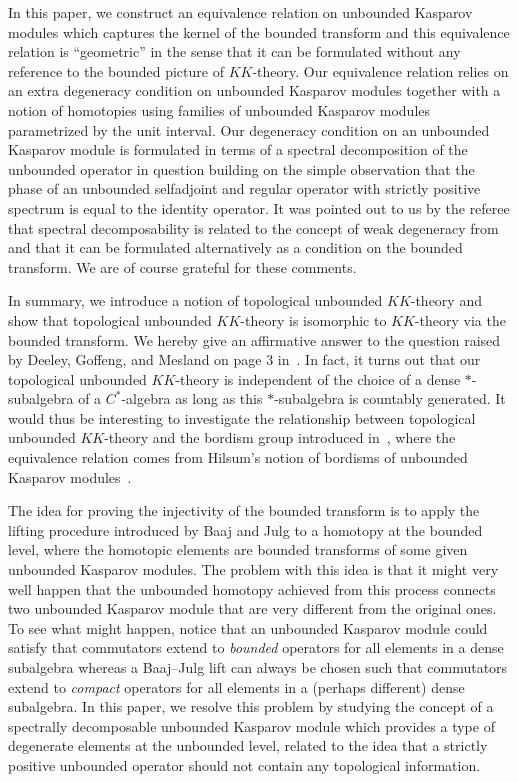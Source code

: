 \documentclass[pdftex]{sigma}
\numberwithin{equation}{section}
\begin{document}
In this paper, we construct an equivalence relation on unbounded Kasparov modules which captures the kernel of the bounded transform and this equivalence relation is ``geometric'' in the sense that it can be formulated without any reference to the bounded picture of $KK$-theory. Our equivalence relation relies on an extra degeneracy condition on unbounded Kasparov modules together with a notion of homotopies using families of unbounded Kasparov modules parametrized by the unit interval. Our degeneracy condition on an unbounded Kasparov module is formulated in terms of a spectral decomposition of the unbounded operator in question building on the simple observation that the phase of an unbounded selfadjoint and regular operator with strictly positive spectrum is equal to the identity operator. It was pointed out to us by the referee that spectral decomposability is related to the concept of weak degeneracy from \cite[Definition~3.1]{DGM:BGU} and that it can be formulated alternatively as a condition on the bounded transform. We are of course grateful for these comments.

In summary, we introduce a notion of topological unbounded $KK$-theory and show that topological unbounded $KK$-theory is isomorphic to $KK$-theory via the bounded transform. We hereby give an affirmative answer to the question raised by Deeley, Goffeng, and Mesland on page $3$ in~\cite{DGM:BGU}. In fact, it turns out that our topological unbounded $KK$-theory is independent of the choice of a dense $*$-subalgebra of a $C^*$-algebra as long as this $*$-subalgebra is countably generated. It would thus be interesting to investigate the relationship between topological unbounded $KK$-theory and the bordism group introduced in~\cite{DGM:BGU}, where the equivalence relation comes from Hilsum's notion of bordisms of unbounded Kasparov modules~\cite{Hil:BIK}.

The idea for proving the injectivity of the bounded transform is to apply the lifting procedure introduced by Baaj and Julg to a homotopy at the bounded level, where the homotopic elements are bounded transforms of some given unbounded Kasparov modules. The problem with this idea is that it might very well happen that the unbounded homotopy achieved from this process connects two unbounded Kasparov module that are very different from the original ones. To see what might happen, notice that an unbounded Kasparov module could satisfy that commutators extend to \emph{bounded} operators for all elements in a dense subalgebra whereas a Baaj--Julg lift can always be chosen such that commutators extend to \emph{compact} operators for all elements in a (perhaps different) dense subalgebra. In this paper, we resolve this problem by studying the concept of a spectrally decomposable unbounded Kasparov module which provides a type of degenerate elements at the unbounded level, related to the idea that a strictly positive unbounded operator should not contain any topological information.
\end{document}

